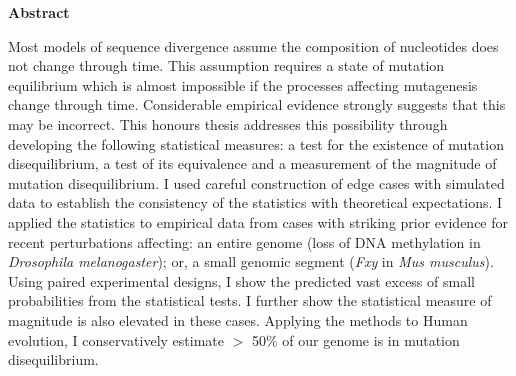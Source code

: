 \thispagestyle{plain}
\begin{center}
    
    \textbf{Abstract}
    
    Most models of sequence divergence assume the composition of nucleotides does not change through time. This assumption requires a state of mutation equilibrium which is almost impossible if the processes affecting mutagenesis change through time. Considerable empirical evidence strongly suggests that this may be incorrect. This honours thesis addresses this possibility through developing the following statistical measures: a test for the existence of mutation disequilibrium, a test of its equivalence and a measurement of the magnitude of mutation disequilibrium. I used careful construction of edge cases with simulated data to establish the consistency of the statistics with theoretical expectations. I applied the statistics to empirical data from cases with striking prior evidence for recent perturbations affecting: an entire genome (loss of DNA methylation in \textit{Drosophila melanogaster}); or, a small genomic segment (\textit{Fxy} in \textit{Mus musculus}). Using paired experimental designs, I show the predicted vast excess of small probabilities from the statistical tests. I further show the statistical measure of magnitude is also elevated in these cases. Applying the methods to Human evolution, I conservatively estimate $>$ 50\% of our genome is in mutation disequilibrium. 


\end{center}